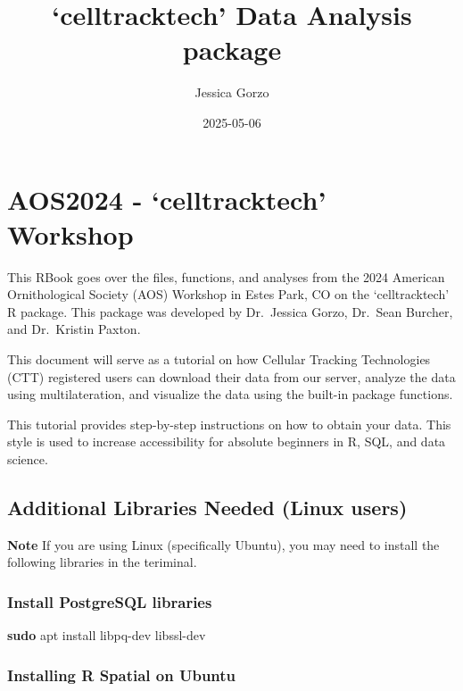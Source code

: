 \documentclass[
]{book}
\title{`celltracktech' Data Analysis package}
\author{Jessica Gorzo}
\date{2025-05-06}
\newenvironment{Shaded}{\begin{snugshade}}{\end{snugshade}}
\newcommand{\FunctionTok}[1]{\textcolor[rgb]{0.13,0.29,0.53}{\textbf{#1}}}
\newcommand{\NormalTok}[1]{#1}
\begin{document}
\maketitle

{
\setcounter{tocdepth}{1}
\tableofcontents
}
\chapter{AOS2024 - `celltracktech' Workshop}\label{aos2024---celltracktech-workshop}

This RBook goes over the files, functions, and analyses from the 2024 American Ornithological Society (AOS) Workshop in Estes Park, CO on the `celltracktech' R package. This package was developed by Dr.~Jessica Gorzo, Dr.~Sean Burcher, and Dr.~Kristin Paxton.

This document will serve as a tutorial on how Cellular Tracking Technologies (CTT) registered users can download their data from our server, analyze the data using multilateration, and visualize the data using the built-in package functions.

This tutorial provides step-by-step instructions on how to obtain your data. This style is used to increase accessibility for absolute beginners in R, SQL, and data science.

\section{Additional Libraries Needed (Linux users)}\label{additional-libraries-needed-linux-users}

\textbf{Note} If you are using Linux (specifically Ubuntu), you may need to install the following libraries in the teriminal.

\subsection{Install PostgreSQL libraries}\label{install-postgresql-libraries}

\begin{Shaded}
\begin{Highlighting}[]
\FunctionTok{sudo}\NormalTok{ apt install libpq{-}dev libssl{-}dev}
\end{Highlighting}
\end{Shaded}

\subsection{Installing R Spatial on Ubuntu}\label{installing-r-spatial-on-ubuntu}
\end{document}

